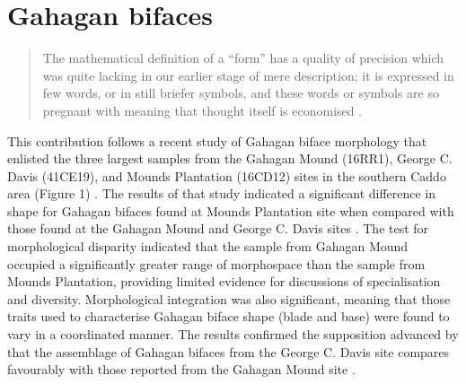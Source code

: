 \documentclass[review]{elsarticle}
\begin{document}
\linenumbers

\section*{Gahagan bifaces}

\begin{quote}
The mathematical definition of a ``form'' has a quality of precision which was quite lacking in our earlier stage of mere description; it is expressed in few words, or in still briefer symbols, and these words or symbols are so pregnant with meaning that thought itself is economised \citep[720-721]{RN11532}.    
\end{quote}

This contribution follows a recent study of Gahagan biface morphology that enlisted the three largest samples from the Gahagan Mound (16RR1), George C. Davis (41CE19), and Mounds Plantation (16CD12) sites in the southern Caddo area (Figure 1) \citep{RN11783}. The results of that study indicated a significant difference in shape for Gahagan bifaces found at Mounds Plantation site when compared with those found at the Gahagan Mound and George C. Davis sites \citep[Figure 7]{RN11783}. The test for morphological disparity indicated that the sample from Gahagan Mound occupied a significantly greater range of morphospace than the sample from Mounds Plantation, providing limited evidence for discussions of specialisation and diversity. Morphological integration was also significant, meaning that those traits used to characterise Gahagan biface shape (blade and base) were found to vary in a coordinated manner. The results confirmed the supposition advanced by \citep{RN3684} that the assemblage of Gahagan bifaces from the George C. Davis site compares favourably with those reported from the Gahagan Mound site \citep{RN5274,RN2740}.


\end{document}
